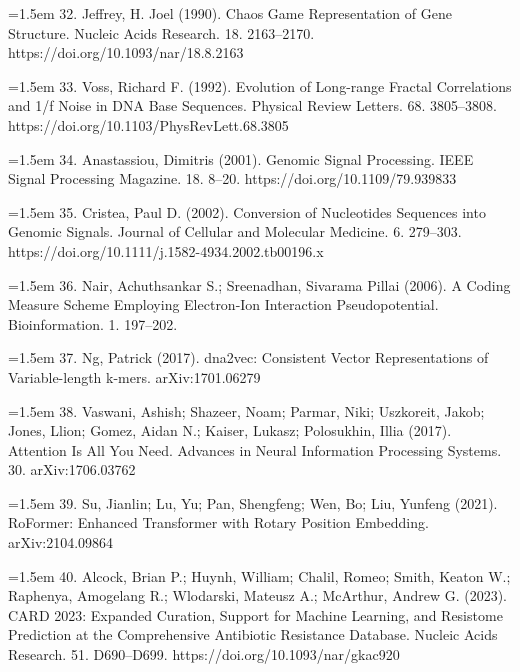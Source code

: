 \documentclass[10.5pt]{article}
\begin{document}
\hangindent=1.5em  32. Jeffrey, H. Joel (1990). Chaos Game Representation of Gene Structure. Nucleic Acids Research. 18. 2163--2170. https://doi.org/10.1093/nar/18.8.2163\par

\hangindent=1.5em  33. Voss, Richard F. (1992). Evolution of Long-range Fractal Correlations and 1/f Noise in DNA Base Sequences. Physical Review Letters. 68. 3805--3808. https://doi.org/10.1103/PhysRevLett.68.3805\par

\hangindent=1.5em  34. Anastassiou, Dimitris (2001). Genomic Signal Processing. IEEE Signal Processing Magazine. 18. 8--20. https://doi.org/10.1109/79.939833\par

\hangindent=1.5em  35. Cristea, Paul D. (2002). Conversion of Nucleotides Sequences into Genomic Signals. Journal of Cellular and Molecular Medicine. 6. 279--303. https://doi.org/10.1111/j.1582-4934.2002.tb00196.x\par

\hangindent=1.5em  36. Nair, Achuthsankar S.; Sreenadhan, Sivarama Pillai (2006). A Coding Measure Scheme Employing Electron-Ion Interaction Pseudopotential. Bioinformation. 1. 197--202.\par

\hangindent=1.5em  37. Ng, Patrick (2017). dna2vec: Consistent Vector Representations of Variable-length k-mers. arXiv:1701.06279\par

\hangindent=1.5em  38. Vaswani, Ashish; Shazeer, Noam; Parmar, Niki; Uszkoreit, Jakob; Jones, Llion; Gomez, Aidan N.; Kaiser, Lukasz; Polosukhin, Illia (2017). Attention Is All You Need. Advances in Neural Information Processing Systems. 30. arXiv:1706.03762\par

\hangindent=1.5em  39. Su, Jianlin; Lu, Yu; Pan, Shengfeng; Wen, Bo; Liu, Yunfeng (2021). RoFormer: Enhanced Transformer with Rotary Position Embedding. arXiv:2104.09864\par

\hangindent=1.5em  40. Alcock, Brian P.; Huynh, William; Chalil, Romeo; Smith, Keaton W.; Raphenya, Amogelang R.; Wlodarski, Mateusz A.; McArthur, Andrew G. (2023). CARD 2023: Expanded Curation, Support for Machine Learning, and Resistome Prediction at the Comprehensive Antibiotic Resistance Database. Nucleic Acids Research. 51. D690--D699. https://doi.org/10.1093/nar/gkac920\par
\end{document}

